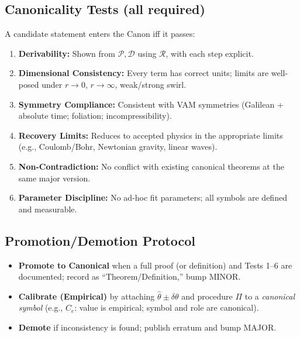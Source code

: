 \documentclass[11pt, a4paper]{article}
\begin{document}
    \subsection*{Canonicality Tests (all required)}
    A candidate statement enters the Canon iff it passes:
    \begin{enumerate}
        \item \textbf{Derivability:} Shown from \(\mathcal{P},\mathcal{D}\) using \(\mathcal{R}\), with each step explicit.
        \item \textbf{Dimensional Consistency:} Every term has correct units; limits are well-posed under \(r\!\to\!0\), \(r\!\to\!\infty\), weak/strong swirl.
        \item \textbf{Symmetry Compliance:} Consistent with VAM symmetries (Galilean + absolute time; foliation; incompressibility).
        \item \textbf{Recovery Limits:} Reduces to accepted physics in the appropriate limits (e.g., Coulomb/Bohr, Newtonian gravity, linear waves).
        \item \textbf{Non-Contradiction:} No conflict with existing canonical theorems at the same major version.
        \item \textbf{Parameter Discipline:} No ad-hoc fit parameters; all symbols are defined and measurable.
    \end{enumerate}

    \subsection*{Promotion/Demotion Protocol}
    \begin{itemize}
        \item \textbf{Promote to Canonical} when a full proof (or definition) and Tests 1–6 are documented; record as “Theorem/Definition,” bump MINOR.
        \item \textbf{Calibrate (Empirical)} by attaching \(\hat{\theta}\pm\delta\theta\) and procedure \(\Pi\) to a \emph{canonical symbol} (e.g., \(C_e\): value is empirical; symbol and role are canonical).
        \item \textbf{Demote} if inconsistency is found; publish erratum and bump MAJOR.
    \end{itemize}
\end{document}
